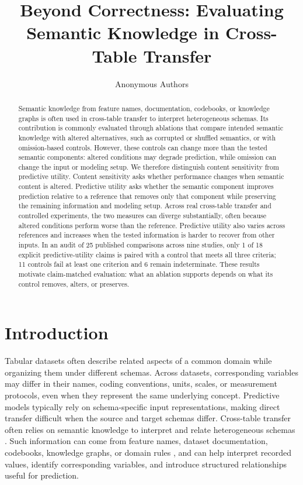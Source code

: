 \documentclass{article} %
\title{Beyond Correctness: Evaluating Semantic Knowledge in Cross-Table Transfer}
\author{Anonymous Authors}
\begin{document}
\maketitle
\begin{abstract}

Semantic knowledge from feature names, documentation, codebooks, or knowledge graphs is often used in cross-table transfer to interpret heterogeneous schemas. 
Its contribution is commonly evaluated through ablations that compare intended semantic knowledge with altered alternatives, such as corrupted or shuffled semantics, or with omission-based controls.
However, these controls can change more than the tested semantic components: altered conditions may degrade prediction, while omission can change the input or modeling setup.
We therefore distinguish content sensitivity from predictive utility.
Content sensitivity asks whether performance changes when semantic content is altered.
Predictive utility asks whether the semantic component improves prediction relative to a reference that removes only that component while preserving the remaining information and modeling setup.
Across real cross-table transfer and controlled experiments, the two measures can diverge substantially, often because altered conditions perform worse than the reference. 
Predictive utility also varies across references and increases when the tested information is harder to recover from other inputs.
In an audit of 25 published comparisons across nine studies, only 1 of 18 explicit predictive-utility claims is paired with a control that meets all three criteria; 11 controls fail at least one criterion and 6 remain indeterminate.
These results motivate claim-matched evaluation: what an ablation supports depends on what its control removes, alters, or preserves.
\end{abstract}

\section{Introduction}

Tabular datasets often describe related aspects of a common domain while organizing them under different schemas.
Across datasets, corresponding variables may differ in their names, coding conventions, units, scales, or measurement protocols, even when they represent the same underlying concept.
Predictive models typically rely on schema-specific input representations, making direct transfer difficult when the source and target schemas differ.
Cross-table transfer often relies on semantic knowledge to interpret and relate heterogeneous schemas \citep{wang2022transtab,kim2024carte,hegselmann2023tabllm}.
Such information can come from feature names, dataset documentation, codebooks, knowledge graphs, or domain rules
\citep{pang2015biobankconnect,li2025harmonization,ruiz2023plato,han2024featllm},
and can help interpret recorded values, identify corresponding variables, and introduce structured relationships useful for prediction.
\end{document}
